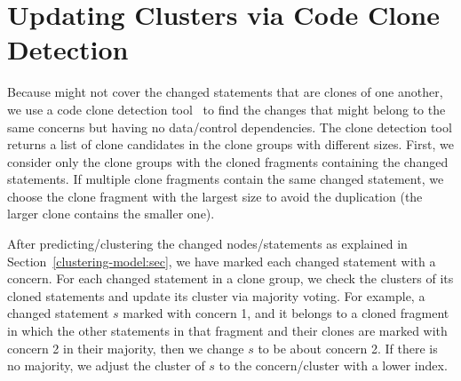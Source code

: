 \section{Updating Clusters via Code Clone Detection}
\label{sec:clone}

Because {\mvpdg} might not cover the changed statements that are
clones of one another, we use a code clone detection
tool~\cite{svajlenko2017fast} to find the changes that might belong to
the same concerns but having no data/control dependencies. The clone
detection tool returns a list of clone candidates in the clone groups
with different sizes. First, we consider only the clone groups with
the cloned fragments containing the changed statements. If multiple
clone fragments contain the same changed statement, we choose the
clone fragment with the largest size to avoid the duplication (the
larger clone contains the smaller one).

After predicting/clustering the changed nodes/statements as explained
in Section~\ref{clustering-model:sec}, we have marked each changed
statement with a concern. For each changed statement in a clone group,
we check the clusters of its cloned statements and update its cluster
via majority voting. For example, a changed statement $s$ marked with
concern 1, and it belongs to a cloned fragment in which the other
statements in that fragment and their clones are marked with concern 2
in their majority, then we change $s$ to be about concern 2. If there
is no majority, we adjust the cluster of $s$ to the concern/cluster
with a lower index.




